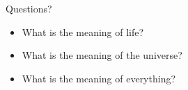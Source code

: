 \documentclass[10pt,xcolor=table]{beamer}
\begin{document}
    \begin{frame}{Questions?}
        \begin{itemize}
            \item What is the meaning of life?
            \item What is the meaning of the universe?
            \item What is the meaning of everything?
        \end{itemize}
    \end{frame}
\end{document}
